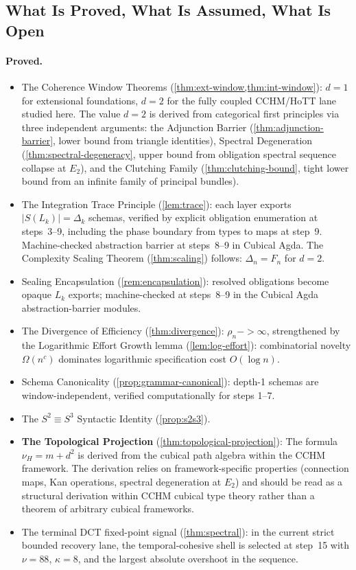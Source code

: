 \documentclass[11pt,a4paper]{article}
\def\to{->}%
\theoremstyle{plain}
\theoremstyle{definition}
\theoremstyle{remark}
\begin{document}
\subsection{What Is Proved, What Is Assumed, What Is Open}

\paragraph{Proved.}
\begin{itemize}[nosep]
    \item The Coherence Window Theorems (\cref{thm:ext-window,thm:int-window}): $d = 1$ for extensional foundations, $d = 2$ for the fully coupled CCHM/HoTT lane studied here.  The value $d = 2$ is derived from categorical first principles via three independent arguments: the Adjunction Barrier (\cref{thm:adjunction-barrier}, lower bound from triangle identities), Spectral Degeneration (\cref{thm:spectral-degeneracy}, upper bound from obligation spectral sequence collapse at $E_2$), and the Clutching Family (\cref{thm:clutching-bound}, tight lower bound from an infinite family of principal bundles).
    \item The Integration Trace Principle (\cref{lem:trace}): each layer exports $|S(L_k)| = \Delta_k$ schemas, verified by explicit obligation enumeration at steps~3--9, including the phase boundary from types to maps at step~9.  Machine-checked abstraction barrier at steps~8--9 in Cubical Agda.
    The Complexity Scaling Theorem (\cref{thm:scaling}) follows: $\Delta_n = F_n$ for $d = 2$.
    \item Sealing Encapsulation (\cref{rem:encapsulation}): resolved obligations become opaque $L_k$ exports; machine-checked at steps~8--9 in the Cubical Agda abstraction-barrier modules.
    \item The Divergence of Efficiency (\cref{thm:divergence}): $\rho_n \to \infty$, strengthened by the Logarithmic Effort Growth lemma (\cref{lem:log-effort}): combinatorial novelty $\Omega(n^c)$ dominates logarithmic specification cost $O(\log n)$.
    \item Schema Canonicality (\cref{prop:grammar-canonical}): depth-1 schemas are window-independent, verified computationally for steps 1--7.
    \item The $S^2 \equiv S^3$ Syntactic Identity (\cref{prop:s2s3}).
    \item \textbf{The Topological Projection} (\cref{thm:topological-projection}): The formula $\nu_H = m + d^2$ is derived from the cubical path algebra within the CCHM framework.  The derivation relies on framework-specific properties (connection maps, Kan operations, spectral degeneration at $E_2$) and should be read as a structural derivation within CCHM cubical type theory rather than a theorem of arbitrary cubical frameworks.
    \item The terminal DCT fixed-point signal (\cref{thm:spectral}): in the current strict bounded recovery lane, the temporal-cohesive shell is selected at step~15 with $\nu=88$, $\kappa=8$, and the largest absolute overshoot in the sequence.
\end{itemize}
\end{document}
